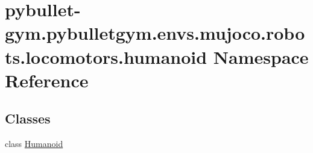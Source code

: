 \hypertarget{namespacepybullet-gym_1_1pybulletgym_1_1envs_1_1mujoco_1_1robots_1_1locomotors_1_1humanoid}{}\section{pybullet-\/gym.pybulletgym.\+envs.\+mujoco.\+robots.\+locomotors.\+humanoid Namespace Reference}
\label{namespacepybullet-gym_1_1pybulletgym_1_1envs_1_1mujoco_1_1robots_1_1locomotors_1_1humanoid}
\subsection*{Classes}
\begin{DoxyCompactItemize}
\item 
class \hyperlink{classpybullet-gym_1_1pybulletgym_1_1envs_1_1mujoco_1_1robots_1_1locomotors_1_1humanoid_1_1_humanoid}{Humanoid}
\end{DoxyCompactItemize}
